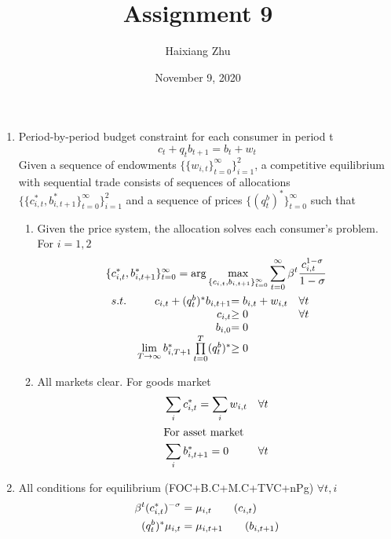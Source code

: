 \documentclass{article}
\title{Assignment 9}
\date{November 9, 2020}
\author{Haixiang Zhu}
\begin{document}
    \maketitle
    \renewcommand{\arraystretch}{1.5}
    \begin{enumerate}
        \item Period-by-period budget constraint for each consumer in period t
        \[c_t+q_tb_{t+1}=b_t+w_t\]
        Given a sequence of endowments $\{\{w_{i,t}\}_{t=0}^\infty\}_{i=1}^2$, a competitive equilibrium with sequential trade consists of sequences of allocations $\{\{c_{i,t}^\ast,b_{i,t+1}^\ast\}_{t=0}^\infty\}_{i=1}^2$ and a sequence of prices $\{(q_{t}^b)^\ast\}_{t=0}^\infty$ such that
        \begin{enumerate}
            \item Given the price system, the allocation solves each consumer's problem. For $i=1,2$
            \begin{align*}
                &\{c_{i,t}^\ast,b_{i,t+1}^\ast\}_{t=0}^\infty=\arg\max_{\{c_{i,t},b_{i,t+1}\}_{t=0}^\infty}\sum_{t=0}^\infty\beta^t\frac{c_{i,t}^{1-\sigma}}{1-\sigma}\\
                &\begin{array}{r@{\quad}r@{}l@{\quad}l}
                s.t.&c_{i,t}+(q_{t}^b)^\ast b_{i,t+1}&= b_{i,t}+w_{i,t}&\forall t\\
                &c_{i,t}&\ge0 &\forall t\\
                &b_{i,0}&=0\\
                &\lim\limits_{T\to\infty}b_{i,T+1}^\ast\prod\limits_{t=0}^T(q_{t}^b)^\ast&\ge0
                \end{array} 
            \end{align*}
            \item All markets clear. For goods market 
            \begin{align*}
                &\sum_i c_{i,t}^\ast=\sum_i w_{i,t}&\forall t\\
                \intertext{For asset market}
                &\sum_i b_{i,t+1}^\ast=0&\forall t
            \end{align*}
        \end{enumerate}
        \item All conditions for equilibrium (FOC+B.C+M.C+TVC+nPg) $\forall t,i$
        \begin{align}
            \beta^t(c_{i,t}^\ast)^{-\sigma}&=\mu_{i,t}\tag{$c_{i,t}$}\\
            (q_{t}^b)^\ast\mu_{i,t}&=\mu_{i,t+1}\tag{$b_{i,t+1}$}\\

\end{align}
\end{enumerate}
\end{document}
